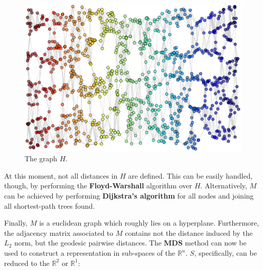 \documentclass[12pt]{article}
\begin{document}
\begin{figure}[H]
	\centering
	\captionsetup{justification=centering}
	\includegraphics[width=.5\linewidth]{studying_isomap/neighbors}
	\caption{The graph $H$.}
	\label{fig:mani_s_graph_h}
\end{figure}

At this moment, not all distances in $H$ are defined. This can be easily handled, though, by performing the \textbf{Floyd-Warshall} algorithm over $H$. Alternatively, $M$ can be achieved by performing \textbf{Dijkstra's algorithm} for all nodes and joining all shortest-path trees found.

Finally, $M$ is a euclidean graph which roughly lies on a hyperplane. Furthermore, the adjacency matrix associated to $M$ contains not the distance induced by the $L_2$ norm, but the geodesic pairwise distances. \cite{gho2006} The \textbf{MDS} method can now be used to construct a representation in sub-spaces of the $\mathbb{R}^n$. $S$, specifically, can be reduced to the $\mathbb{R}^2$ or $\mathbb{R}^1$:
\end{document}
